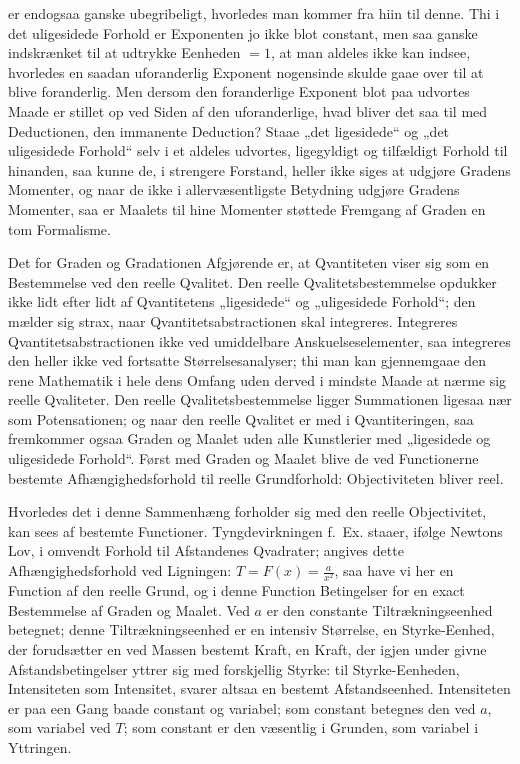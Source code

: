 \documentclass[12pt]{book}
\newcommand{\opage}[1]{\marginnote{\footnotesize\textit{[#1]}}}
\begin{document}
er endogsaa ganske ubegribeligt, hvorledes man kommer fra hiin til denne. Thi i det uligesidede Forhold
er Exponenten jo ikke blot constant, men saa ganske indskrænket til at udtrykke Eenheden $= 1$, at man
aldeles ikke kan indsee, hvorledes en saadan uforanderlig Exponent nogensinde skulde gaae over til at
blive foranderlig. Men dersom den foranderlige Exponent blot paa udvortes Maade er stillet op ved Siden
af den uforanderlige, hvad bliver det saa til med Deductionen, den immanente Deduction? Staae „det
ligesidede“ og „det uligesidede Forhold“ selv i et aldeles udvortes, ligegyldigt og tilfældigt Forhold
til hinanden, saa kunne de, i strengere Forstand, heller ikke siges at udgjøre Gradens Momenter, og naar
de ikke i allervæsentligste Betydning udgjøre Gradens Momenter, saa er Maalets til hine Momenter støttede
Fremgang af Graden en tom Formalisme.

Det for Graden og Gradationen Afgjørende er, at Qvantiteten viser sig som en Bestemmelse ved den reelle
Qvalitet. Den reelle Qvalitetsbestemmelse opdukker ikke lidt efter lidt af Qvantitetens „ligesidede“ og
„uligesidede Forhold“; den mælder sig strax, naar Qvantitetsabstractionen skal integreres. Integreres
Qvantitetsabstractionen ikke ved umiddelbare Anskuelseselementer, saa integreres den heller ikke ved
fortsatte Størrelsesanalyser; thi man kan gjennemgaae den rene Mathematik i hele dens Omfang uden derved
i mindste Maade at nærme sig reelle Qvaliteter. Den reelle Qvalitetsbestemmelse ligger Summationen
ligesaa nær som Potensationen; og naar den reelle Qvalitet er med i Qvantiteringen, saa fremkommer ogsaa
Graden og Maalet uden alle Kunstlerier med „ligesidede og uligesidede Forhold“. Først med Graden og
Maalet blive de ved Functionerne bestemte Afhængighedsforhold til reelle Grundforhold: Objectiviteten
bliver reel.

Hvorledes det i denne Sammenhæng forholder sig med den reelle Objectivitet, kan sees af bestemte
Functioner. Tyngdevirkningen f.\ Ex. staaer, ifølge Newtons Lov, i omvendt Forhold til Afstandenes
Qvadrater; angives dette Afhængighedsforhold ved Ligningen: $T = F(x) = \frac{a}{x^{2}}$, saa have vi
her en
\opage{313} Function af den reelle Grund, og i denne Function Betingelser for en exact Bestemmelse af Graden og
Maalet. Ved $a$ er den constante Tiltrækningseenhed betegnet; denne Tiltrækningseenhed er en intensiv
Størrelse, en Styrke-Eenhed, der forudsætter en ved Massen bestemt Kraft, en Kraft, der igjen under
givne Afstandsbetingelser yttrer sig med forskjellig Styrke: til Styrke-Eenheden, Intensiteten som
Intensitet, svarer altsaa en bestemt Afstandseenhed. Intensiteten er paa een Gang baade constant og
variabel; som constant betegnes den ved $a$, som variabel ved $T$; som constant er den væsentlig i
Grunden, som variabel i Yttringen.
\end{document}
